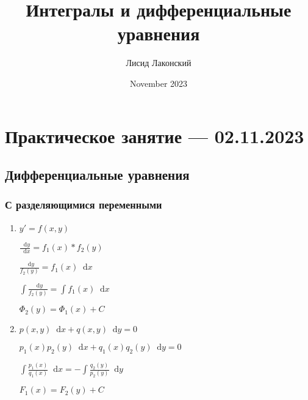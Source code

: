 \documentclass{article}
\title{Интегралы и дифференциальные уравнения}
\author{Лисид Лаконский}
\date{November 2023}
\newcommand*\diff{\mathop{}\!\mathrm{d}}
\begin{document}
\raggedright

\maketitle

\tableofcontents
\pagebreak

\section{Практическое занятие — 02.11.2023}

\subsection{Дифференциальные уравнения}

\subsubsection{С разделяющимися переменными}

\begin{enumerate}
    \item $y' = f(x, y)$

    $\frac{\diff y}{\diff x} = f_1(x) * f_2(y)$
    
    $\frac{\diff y}{f_2(y)} = f_1(x) \diff x$

    $\int \frac{\diff y}{f_2(y)} = \int f_1(x) \diff x$

    $\Phi_2(y) = \Phi_1(x) + C$
    \item $p(x, y) \diff x + q (x, y) \diff y = 0$

    $p_1(x) p_2(y) \diff x + q_1 (x) q_2 (y) \diff y = 0$

    $\int \frac{p_1(x)}{q_1(x)} \diff x = - \int \frac{q_2(y)}{p_2(y)} \diff y$

    $F_1(x) = F_2(y) + C$
\end{enumerate}
\end{document}
